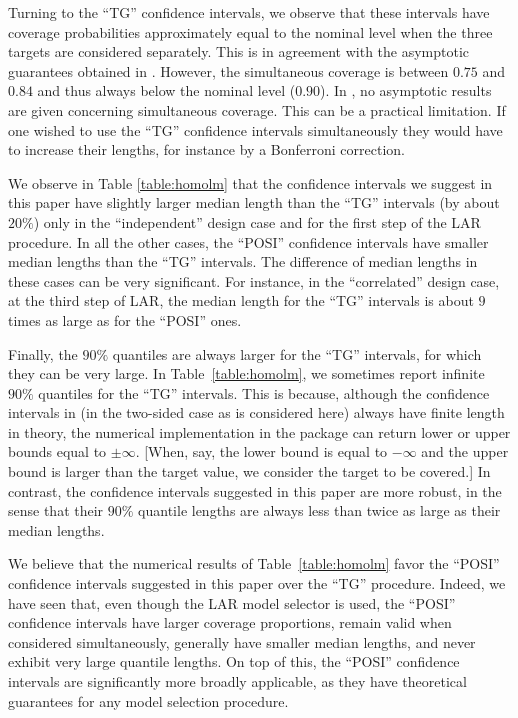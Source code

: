 \documentclass[preprint]{imsart}
\numberwithin{equation}{section}
\begin{document}
Turning to the ``TG'' confidence intervals, we observe that these intervals have coverage probabilities approximately equal to the nominal level when the three targets are considered separately. This is in agreement with the asymptotic guarantees obtained in \cite{Tib15a}. However, the simultaneous coverage is between $0.75$ and $0.84$ and thus always below the nominal level ($0.90$). In \cite{Tib15a}, no asymptotic results are given concerning simultaneous coverage. This can be a practical limitation. If one wished to use the ``TG'' confidence intervals simultaneously they would have to increase their lengths, for instance by a Bonferroni correction.  

We observe in Table \ref{table:homolm} that the confidence intervals we suggest in this paper have slightly larger median length than the ``TG'' intervals (by about $20 \%$) only in the ``independent'' design case and for the first step of the LAR procedure. In all the other cases, the ``POSI'' confidence intervals have smaller median lengths than the ``TG'' intervals. The difference of median lengths in these cases can be very significant. For instance, in the ``correlated'' design case, at the third step of LAR, the median length for the ``TG'' intervals is about $9$ times as large as for the ``POSI'' ones.  

Finally, the $90 \%$ quantiles are always larger for the ``TG'' intervals, for which they can be very large. In Table~\ref{table:homolm}, we sometimes report infinite $90 \%$ quantiles for the ``TG'' intervals. This is because, although the confidence intervals in \cite{Tib15a} (in the two-sided case as is considered here) always have finite length in theory, the numerical implementation in the \verb@R@ package \verb@selectiveInference@ can return lower or upper bounds equal to $\pm \infty$. [When, say, the lower bound is equal to $- \infty$ and the upper bound is larger than the target value, we consider the target to be covered.] In contrast, the confidence intervals suggested in this paper are more robust, in the sense that their $90 \%$ quantile lengths are always less than twice as large as their median lengths.

We believe that the numerical results of Table~\ref{table:homolm} favor the ``POSI'' confidence intervals suggested in this paper over the ``TG'' procedure. Indeed, we have seen that, even though the LAR model selector is used, the ``POSI'' confidence intervals have larger coverage proportions, remain valid when considered simultaneously, generally have smaller median lengths, and never exhibit very large quantile lengths. On top of this, the ``POSI'' confidence intervals are significantly more broadly applicable, as they have theoretical guarantees for any model selection procedure.
\end{document}
